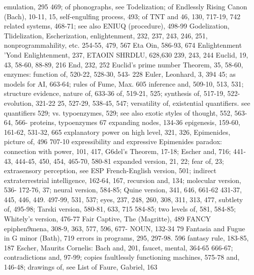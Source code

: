 emulation, 295                                  469; of phonographs, see Todelization; of
Endlessly Rising Canon (Bach), 10-11, 15,       self-engulfing process, 493; of TNT and
46, 130, 717-19, 742                            related systems, 468-71; see also
ENIUQ (procedure), 498-99                       Godelization, Tlidelization, Escherization,
enlightenment, 232, 237, 243, 246, 251,         nonprogrammahility, etc.
254-55, 479, 567                                Eta Oin, 586-93, 674
Enlightenment 'Yond Enlightenment, 237,         ETAOIN SHRDLU, 628,630
239, 243, 244                                   Euclid, 19, 43, 58-60, 88-89, 216
End, 232, 252                                   Euclid's prime number Theorem, 35, 58-60,
enzymes: function of, 520-22, 528-30, 543-      228 Euler, Leonhard, 3, 394
45; as models for AI, 663-64; rules of          Fume, Max. 605
inference and, 509-10, 513, 531; structure      evidence, nature of, 633-36
of, 519-21, 525; synthesis of, 517-19, 522-     evolution, 321-22
25, 527-29, 538-45, 547; versatility of,        existential quantifiers. see quantifiers
529; vs. typoenzymes, 529; see also             exotic styles of thought, 552, 563-64, 566-
proteins, typoenzymes                           67 expanding nodes, 134-36
epigenesis, 159-60, 161-62, 531-32, 665         explanatory power on high level, 321, 326,
Epimenides, picture of, 496                     707-10 expressibility and expressive
Epimenides paradox: connection with             power, 101, 417,
G6del's Theorem, 17-18; Escher and, 716;        441-43, 444-45, 450, 454, 465-70, 580-81
expanded version, 21, 22; fear of, 23;          extrasensory perception, see ESP
French-English version, 501; indirect           extraterrestrial intelligence, 162-64, 167,
recursion and, 134; molecular version, 536-     172-76,
37; neural version, 584-85; Quine version,      341, 646, 661-62
431-37, 445, 446, 449. 497-99, 531, 537;        eyes, 237, 248, 260, 308, 311, 313, 477,
subtlety of, 495-98; Tarski version, 580-81,    633, 715
584-85; two levels of, 581, 584-85;
Whitely's version, 476-77                       Fair Captive, The (Magritte), 489 FANCY
epiphen9mena, 308-9, 363, 577, 596, 677-        NOUN, 132-34
79                                              Fantasia and Fugue in G minor (Bath), 719
errors in programs, 295, 297-98. 596            fantasy rule, 183-85, 187
Escher, Maurits Cornelis: Bach and, 201,        faucet, mental, 364-65
666-67; contradictions and, 97-99; copies       faultlessly functioning machines, 575-78
and, 146-48; drawings of, see List of           Faure, Gabriel, 163
